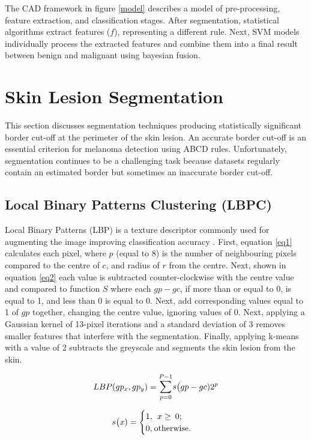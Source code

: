 \documentclass[10.5pt]{report}
\begin{document}
The CAD framework in figure \ref{model} describes a model of pre-processing, feature extraction, and classification stages. After segmentation, statistical algorithms extract features ($f$), representing a different rule. Next, SVM models individually process the extracted features and combine them into a final result between benign and malignant using bayesian fusion.

\section{Skin Lesion Segmentation}
This section discusses segmentation techniques producing statistically significant border cut-off at the perimeter of the skin lesion. An accurate border cut-off is an essential criterion for melanoma detection \cite{Pereira2020, Kaya2016} using ABCD rules. Unfortunately, segmentation continues to be a challenging task because datasets regularly contain an estimated border but sometimes an inaccurate border cut-off.

\subsection{Local Binary Patterns Clustering (LBPC)}
Local Binary Patterns (LBP) is a texture descriptor commonly used for augmenting the image improving classification accuracy \cite{Pereira2020, Kaya2016}. First, equation \ref{eq1} calculates each pixel, where $p$ (equal to 8) is the number of neighbouring pixels compared to the centre of $c$, and radius of $r$ from the centre. Next, shown in equation \ref{eq2} each value is subtracted counter-clockwise with the centre value and compared to function $S$ where each $gp - gc$, if more than or equal to 0, is equal to 1, and less than 0 is equal to 0. Next, add corresponding values equal to 1 of $gp$ together, changing the centre value, ignoring values of 0. Next, applying a Gaussian kernel of 13-pixel iterations and a standard deviation of 3 removes smaller features that interfere with the segmentation. Finally, applying k-means with a value of 2 subtracts the greyscale and segments the skin lesion from the skin.

\begin{equation} \label{eq1}
LBP(gp_x, gp_y) = \mathlarger{\sum}_{p=0}^{P-1}s\big(gp - gc)2^p
\end{equation}

\begin{equation} \label{eq2}
s\big(x) = 
\begin{cases}
1,\:\:x\geq\:0; \\
0,\:$otherwise$.
\end{cases}
\end{equation}
\end{document}
